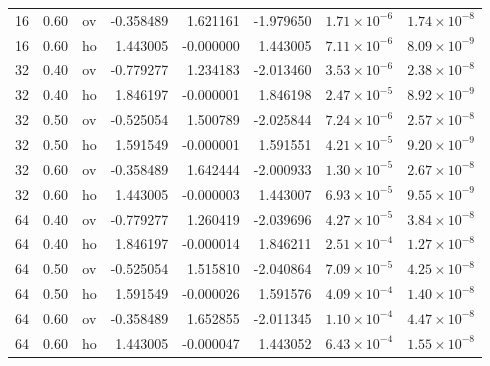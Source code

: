 \documentclass[11pt,a4paper]{article}
\begin{document}
\begin{longtable}{@{}rrcrrrrr@{}}
16 & 0.60 & ov & -0.358489 & 1.621161 & -1.979650 & $1.71\times10^{-6}$ & $1.74\times10^{-8}$\\
16 & 0.60 & ho & 1.443005 & -0.000000 & 1.443005 & $7.11\times10^{-6}$ & $8.09\times10^{-9}$\\
32 & 0.40 & ov & -0.779277 & 1.234183 & -2.013460 & $3.53\times10^{-6}$ & $2.38\times10^{-8}$\\
32 & 0.40 & ho & 1.846197 & -0.000001 & 1.846198 & $2.47\times10^{-5}$ & $8.92\times10^{-9}$\\
32 & 0.50 & ov & -0.525054 & 1.500789 & -2.025844 & $7.24\times10^{-6}$ & $2.57\times10^{-8}$\\
32 & 0.50 & ho & 1.591549 & -0.000001 & 1.591551 & $4.21\times10^{-5}$ & $9.20\times10^{-9}$\\
32 & 0.60 & ov & -0.358489 & 1.642444 & -2.000933 & $1.30\times10^{-5}$ & $2.67\times10^{-8}$\\
32 & 0.60 & ho & 1.443005 & -0.000003 & 1.443007 & $6.93\times10^{-5}$ & $9.55\times10^{-9}$\\
64 & 0.40 & ov & -0.779277 & 1.260419 & -2.039696 & $4.27\times10^{-5}$ & $3.84\times10^{-8}$\\
64 & 0.40 & ho & 1.846197 & -0.000014 & 1.846211 & $2.51\times10^{-4}$ & $1.27\times10^{-8}$\\
64 & 0.50 & ov & -0.525054 & 1.515810 & -2.040864 & $7.09\times10^{-5}$ & $4.25\times10^{-8}$\\
64 & 0.50 & ho & 1.591549 & -0.000026 & 1.591576 & $4.09\times10^{-4}$ & $1.40\times10^{-8}$\\
64 & 0.60 & ov & -0.358489 & 1.652855 & -2.011345 & $1.10\times10^{-4}$ & $4.47\times10^{-8}$\\
64 & 0.60 & ho & 1.443005 & -0.000047 & 1.443052 & $6.43\times10^{-4}$ & $1.55\times10^{-8}$\\
\bottomrule\end{longtable}\endgroup
\end{document}
